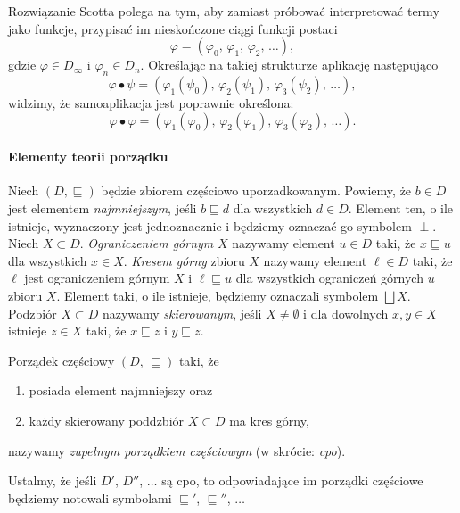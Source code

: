 Rozwiązanie Scotta polega na tym, aby zamiast próbować interpretować termy jako funkcje, przypisać im nieskończone ciągi funkcji postaci 
\[
  \varphi = (\varphi_0,\,\varphi_1,\,\varphi_2,\,\dots),
\]
gdzie \(\varphi \in D_\infty\) i \(\varphi_n\in D_n\). Określając na takiej strukturze aplikację następująco
\[
  \varphi\bullet\psi = (\varphi_1(\psi_0),\,\varphi_2(\psi_1),\,\varphi_3(\psi_2),\,\dots),
\]
widzimy, że samoaplikacja jest poprawnie określona: 
\[
  \varphi\bullet\varphi = (\varphi_1(\varphi_0),\,\varphi_2(\varphi_1),\,\varphi_3(\varphi_2),\,\dots).
\]

\paragraph{Elementy teorii porządku} 
Niech \((D,\sqsubseteq)\) będzie zbiorem częściowo uporzadkowanym. Powiemy, że \(b\in D\) jest elementem \emph{najmniejszym}, jeśli \(b\sqsubseteq d\) dla wszystkich \(d\in D\). Element ten, o ile istnieje, wyznaczony jest jednoznacznie i będziemy oznaczać go symbolem \(\perp\). Niech \(X\subset D\). \emph{Ograniczeniem górnym} \(X\) nazywamy element \(u\in D\) taki, że \(x\sqsubseteq u\) dla wszystkich \(x\in X\). \emph{Kresem górny} zbioru \(X\) nazywamy element \(\ell\in D\) taki, że \(\ell\) jest ograniczeniem górnym \(X\) i \(\ell\sqsubseteq u\) dla wszystkich ograniczeń górnych \(u\) zbioru \(X\). Element taki, o ile istnieje, będziemy oznaczali symbolem \(\bigsqcup X\). Podzbiór \(X\subset D\) nazywamy \emph{skierowanym}, jeśli \(X\neq\emptyset\) i dla dowolnych \(x, y\in X\) istnieje \(z\in X\) taki, że \(x\sqsubseteq z\) i \(y\sqsubseteq z\). 

\begin{definicja}%
Porządek częściowy \((D,\,\sqsubseteq)\) taki, że
\begin{enumerate}[label={(\alph*)}, ref={(\alph*)}]
  \setlength\itemsep{0em}
  \item posiada element najmniejszy oraz
  \item każdy skierowany poddzbiór \(X\subset D\) ma kres górny,
\end{enumerate}
  nazywamy \emph{zupełnym porządkiem częściowym} (w skrócie: \emph{cpo}).
\end{definicja}

Ustalmy, że jeśli \(D'\), \(D''\), \(\dots\)  są cpo, to odpowiadające im porządki częściowe będziemy notowali symbolami \(\sqsubseteq'\), \(\sqsubseteq''\), \(\dots\)

